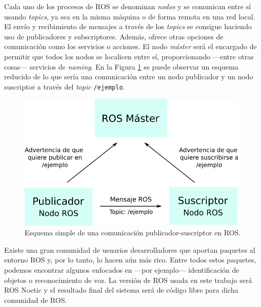 Cada uno de los procesos de ROS se denominan \textit{nodos} y se comunican entre sí usando \textit{topics}, ya sea en la misma máquina o de forma remota en una red local. El envío y recibimiento de mensajes a través de los \textit{topics} se consigue haciendo uso de publicadores y subscriptores. Además, ofrece otras opciones de comunicación como los servicios o acciones. El nodo \textit{máster} será el encargado de permitir que todos los nodos se localicen entre sí, proporcionando ---entre otras cosas--- servicios de \textit{naming}. En la Figura \ref{fig:ros} se puede observar un esquema reducido de lo que sería una comunicación entre un nodo publicador y un nodo suscriptor a través del \textit{topic} \verb|/ejemplo|.\\

\begin{figure} [h!]
  \begin{center}
    \includegraphics[width=11cm]{figs/ros.png}
  \end{center}
  \captionsetup{justification=centering}
  \caption{Esquema simple de una comunicación publicador-suscriptor en ROS.}
  \label{fig:ros}
\end{figure}

Existe una gran comunidad de usuarios desarrolladores que aportan paquetes al entorno ROS y, por lo tanto, lo hacen aún más rico. Entre todos estos paquetes, podemos encontrar algunos enfocados en ---por ejemplo--- identificación de objetos o reconocimiento de voz. La versión de ROS usada en este trabajo será ROS Noetic y el resultado final del sistema será de código libre para dicha comunidad de ROS.